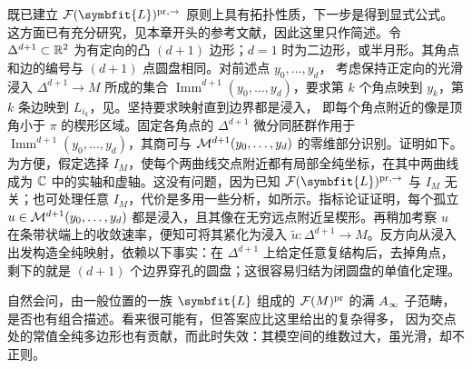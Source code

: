既已建立 $\F(\symbfit{L})^{\mathrm{pr},\allowbreak \to}$ 原则上具有拓扑性质，下一步是得到显式公式。这方面已有充分研究，见本章开头的参考文献，因此这里只作简述。令 $\Delta^{d+1}\subset\mathbb R^2$ 为有定向的凸 $(d+1)$ 边形；$d=1$ 时为二边形，或半月形。其角点和边的编号与 $(d+1)$ 点圆盘相同。对前述点 $y_0,\allowbreak \ldots,\allowbreak y_d$，
考虑保持正定向的光滑浸入 $\Delta^{d+1}\to M$ 所成的集合 $\operatorname{Imm}^{d+1}(y_0,\allowbreak \ldots,\allowbreak y_d)$，要求第 $k$ 个角点映到 $y_k$，第 $k$ 条边映到 $L_{i_k}$，见。坚持要求映射直到边界都是浸入，
即每个角点附近的像是顶角小于 $\pi$ 的楔形区域。固定各角点的 $\Delta^{d+1}$ 微分同胚群作用于 $\operatorname{Imm}^{d+1}(y_0,\allowbreak \ldots,\allowbreak y_d)$，其商可与 $\mathcal M^{d+1}(y_0,\allowbreak \ldots,\allowbreak y_d)$ 的零维部分识别。证明如下。为方便，假定选择 $I_M$，使每个两曲线交点附近都有局部全纯坐标，在其中两曲线成为 $\mathbb C$ 中的实轴和虚轴。这没有问题，因为已知 $\F(\symbfit{L})^{\mathrm{pr},\allowbreak \to}$ 与 $I_M$ 无关；也可处理任意 $I_M$，代价是多用一些分析，如所示。指标论证证明，每个孤立 $u\in\mathcal M^{d+1}(y_0,\allowbreak \ldots,\allowbreak y_d)$ 都是浸入，且其像在无穷远点附近呈楔形。再稍加考察 $u$ 在条带状端上的收敛速率，便知可将其紧化为浸入 $\tilde u:\Delta^{d+1}\to M$。反方向从浸入出发构造全纯映射，依赖以下事实：在 $\Delta^{d+1}$ 上给定任意复结构后，去掉角点，剩下的就是 $(d+1)$ 个边界穿孔的圆盘；这很容易归结为闭圆盘的单值化定理。
\begin{note}\label{st:13.4}
自然会问，由一般位置的一族 $\symbfit{L}$ 组成的 $\mathcal F(M)^{\mathrm{pr}}$ 的满 $A_\infty$ 子范畴，是否也有组合描述。看来很可能有，但答案应比这里给出的复杂得多，
因为交点处的常值全纯多边形也有贡献，而此时失效：其模空间的维数过大，虽光滑，却不正则。
\end{note}

